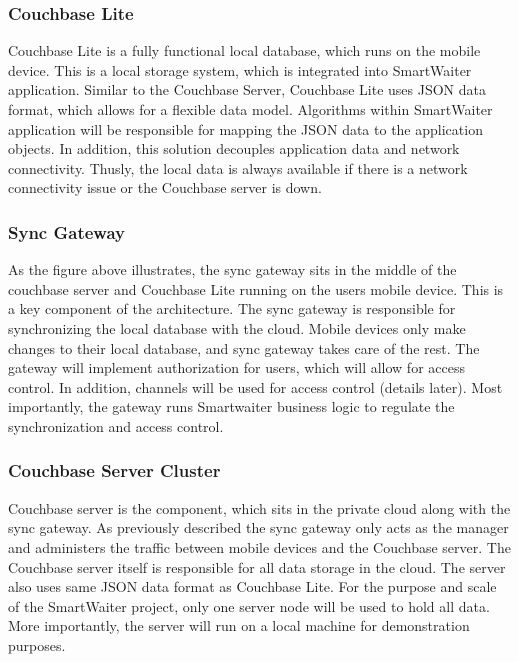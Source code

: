 \documentclass[12pt, titlepage]{article}
\begin{document}
\subsubsection{Couchbase Lite}
Couchbase Lite is a fully functional local database, which runs on the mobile device. This is a local storage system, which is integrated into SmartWaiter application.  Similar to the Couchbase Server, Couchbase Lite uses JSON data format, which allows for a flexible data model. Algorithms within SmartWaiter application will be responsible for mapping the JSON data to the application objects. In addition, this solution decouples application data and network connectivity. Thusly, the local data is always available if there is a network connectivity issue or the Couchbase server is down. 

\subsubsection{Sync Gateway}
As the figure above illustrates, the sync gateway sits in the middle of the couchbase server and Couchbase Lite running on the users mobile device. This is a key component of the architecture. The sync gateway is responsible for synchronizing the local database with the cloud. Mobile devices only make changes to their local database, and sync gateway takes care of the rest.  The gateway will implement authorization for users, which will allow for access control. In addition, channels will be used for access control (details later). Most importantly, the gateway runs Smartwaiter business logic to regulate the synchronization and access control.

\subsubsection{Couchbase Server Cluster}
Couchbase server is the component, which sits in the private cloud along with the sync gateway. As previously described the sync gateway only acts as the manager and administers the traffic between mobile devices and the Couchbase server. The Couchbase server itself is responsible for all data storage in the cloud. The server also uses same JSON data format as Couchbase Lite. For the purpose and scale of the SmartWaiter project, only one server node will be used to hold all data. More importantly, the server will run on a local machine for demonstration purposes. 
\end{document}
